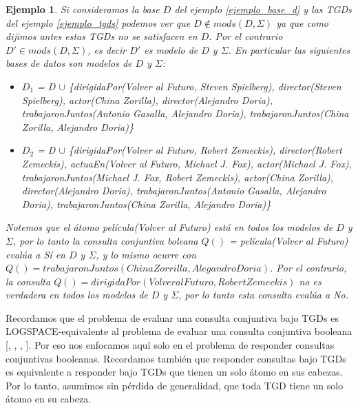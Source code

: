 \documentclass[11pt,a4paper,twoside]{tesis}
\newtheorem{exmp}{Ejemplo}
\begin{document}
\begin{exmp} \label{ejemplo_responder_consultas_bajo_tgds}
Si consideramos la base $D$ del ejemplo \ref{ejemplo_base_d} y las TGDs del ejemplo \ref{ejemplo_tgds} podemos ver que $D \notin mods(D, \Sigma)$ ya que como dijimos antes estas TGDs no se satisfacen en $D$. Por el contrario  $D\prime \in mods(D, \Sigma)$, es decir $D\prime$ es modelo de $D$ y $\Sigma$. En particular las siguientes bases de datos son modelos de  $D$ y $\Sigma$:   

\begin{itemize}
    \item 
      \(D_1\) = D \(\cup\) \{\textit{dirigidaPor(Volver al Futuro, Steven Spielberg), director(Steven Spielberg),
    actor(China Zorilla), director(Alejandro Doria), trabajaronJuntos(Antonio Gasalla, Alejandro Doria), trabajaronJuntos(China Zorilla, Alejandro Doria)}\}
    \item  \(D_2\) = D \(\cup\)  \{\textit{dirigidaPor(Volver al Futuro, Robert Zemeckis), director(Robert Zemeckis), actuaEn(Volver al Futuro, Michael J. Fox), actor(Michael J. Fox), trabajaronJuntos(Michael J. Fox, Robert Zemeckis),  actor(China Zorilla), director(Alejandro Doria), trabajaronJuntos(Antonio Gasalla, Alejandro Doria), trabajaronJuntos(China Zorilla, Alejandro Doria)}\}

\end{itemize} 

Notemos que el átomo \textit{película(Volver al Futuro)} está en todos los \textit{modelos} de $D$ y $\Sigma$, por lo tanto la consulta conjuntiva boleana $Q()$ = película(Volver al Futuro) evalúa a \textit{Sí} en $D$ y $\Sigma$, y lo mismo ocurre con $Q() = trabajaronJuntos(China Zorrilla, Alegandro Doria)$. Por el contrario, la consulta $Q() = dirigidaPor(Volver al Futuro, Robert Zemeckis)$ no es verdadera en todos los \textit{modelos} de $D$ y $\Sigma$, por lo tanto esta consulta evalúa a \textit{No}.
\end{exmp} 

Recordamos que el problema de evaluar una consulta conjuntiva bajo TGDs es LOGSPACE-equivalente al problema de evaluar una consulta conjuntiva booleana [\cite{Chandra}, \cite{Deutsch}, \cite{Fagin}, \cite{Johnson}]. Por eso nos enfocamos aquí solo en el problema de responder consultas conjuntivas booleanas. Recordamos también que responder consultas bajo TGDs es equivalente a responder bajo TGDs que tienen un solo átomo en sus cabezas. Por lo tanto, asumimos sin pérdida de generalidad, que toda TGD tiene un solo átomo en su cabeza.
\end{document}
